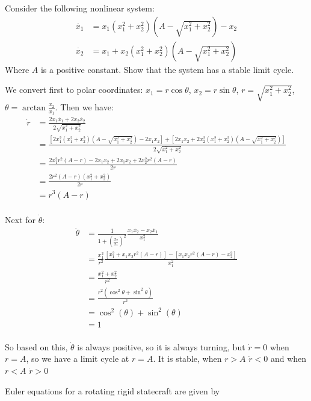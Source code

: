 \documentclass[11pt]{article}
\begin{document}
Consider the following nonlinear system:
\begin{align*}
    \dot{x_1} &= x_1 (x_1^2 + x_2^2)(A - \sqrt{x_1^2 + x_2^2}) - x_2\\
    \dot{x_2} &= x_1 + x_2 (x_1^2 + x_2^2)(A - \sqrt{x_1^2 + x_2^2})
\end{align*}
Where $A$ is a positive constant. 
Show that the system has a stable limit cycle.

\soln


We convert first to polar coordinates: $x_1 = r \cos \theta$, $x_2 = r \sin \theta$, $r = \sqrt{x_1^2 + x_2^2}$, $\theta = \arctan \frac{x_2}{x_1}$.
Then we have:
\begin{align*}
    \dot{r} &= \frac{2x_1\dot{x_1} + 2x_2 \dot{x_2}}{2\sqrt{x_1^2 + x_2^2}}\\
    &= \frac{\left[2x_1^2(x_1^2 + x_2^2)(A - \sqrt{x_1^2 + x_2^2}) - 2x_1x_2\right] + \left[ 2x_1x_2 + 2x_2^2(x_1^2 + x_2^2)(A - \sqrt{x_1^2 + x_2^2}) \right]}{2\sqrt{x_1^2 + x_2^2}}\\
    &= \frac{2x_1^2r^2(A - r) - 2x_1x_2 + 2x_1x_2 + 2x_2^2r^2(A - r)}{2r}\\
    &= \frac{2r^2(A - r)(x_1^2 + x_2^2)}{2r} \\
    &= r^3(A - r)\\
\end{align*}

Next for $\dot{\theta}$:
\begin{align*}
    \dot{\theta} &= \frac{1}{1 + \left(\frac{x_2}{x_1}\right)^2} \frac{x_1\dot{x_2} - x_2\dot{x_1}}{x_1^2} \\
    &= \frac{x_1^2}{r^2} \frac{\left[ x_1^2 + x_1x_2 r^2 (A - r) \right] - \left[x_1x_2r^2(A-r) - x_2^2 \right]}{x_1^2}\\
    &= \frac{x_1^2 + x_2^2}{r^2} \\
    &= \frac{r^2(\cos^2 \theta + \sin^2 \theta)}{r^2}\\
    &= \cos^2(\theta) + \sin^2(\theta)\\
    &= 1\\
\end{align*}

So based on this, $\dot{\theta}$ is always positive, so it is always turning,
but $\dot{r} = 0$ when $r = A$, so we have a limit cycle at $r = A$.
It is stable, when $r > A$ $\dot{r} < 0$ and when $r < A$ $\dot{r} > 0$


Euler equations for a rotating rigid statecraft are given by
\end{document}
